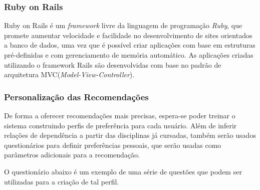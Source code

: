 \subsubsection{Ruby on Rails}

	Ruby on Rails é um \textit{framework} livre da linguagem de programação \textit{Ruby}, que promete aumentar velocidade e facilidade no desenvolvimento de sites orientados a banco de dados, uma vez que é possível criar aplicações com base em estruturas pré-definidas e com gerenciamento de memória automático. As aplicações criadas utilizando o framework Rails são desenvolvidas com base no padrão de arquitetura MVC(\textit{Model-View-Controller}).

\subsubsection{Personalização das Recomendações} %
\label{ssub:personaliza_o_das_recomenda_es}

	De forma a oferecer recomendações mais precisas, espera-se poder treinar o sistema construindo perfis de preferência para cada usuário. Além de inferir relações de dependência a partir das disciplinas já cursadas, também serão usados questionários para definir preferências pessoais, que serão usadas como parâmetros adicionais para a recomendação.

	O questionário abaixo é um exemplo de uma série de questões que podem ser utilizadas para a criação de tal perfil.

